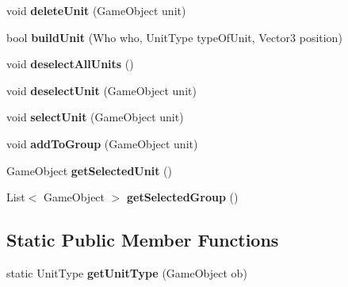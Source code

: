 \begin{DoxyCompactItemize}
\item 
\hypertarget{class_game_controller_a6beec252fc2cf4bbeb8cec79d5174374}{}void {\bfseries delete\+Unit} (Game\+Object unit)\label{class_game_controller_a6beec252fc2cf4bbeb8cec79d5174374}

\item 
\hypertarget{class_game_controller_af2a993666311cdea53c950859c713e35}{}bool {\bfseries build\+Unit} (Who who, Unit\+Type type\+Of\+Unit, Vector3 position)\label{class_game_controller_af2a993666311cdea53c950859c713e35}

\item 
\hypertarget{class_game_controller_a6969a4feb3cbc18212954e0bb7e2e3cd}{}void {\bfseries deselect\+All\+Units} ()\label{class_game_controller_a6969a4feb3cbc18212954e0bb7e2e3cd}

\item 
\hypertarget{class_game_controller_ae3722a2af86bf28e6152de6f9ed802c8}{}void {\bfseries deselect\+Unit} (Game\+Object unit)\label{class_game_controller_ae3722a2af86bf28e6152de6f9ed802c8}

\item 
\hypertarget{class_game_controller_a9a5e2e7359a2d77423644c92678154d2}{}void {\bfseries select\+Unit} (Game\+Object unit)\label{class_game_controller_a9a5e2e7359a2d77423644c92678154d2}

\item 
\hypertarget{class_game_controller_a4fb46a1b2d3b5132ef792f81db466586}{}void {\bfseries add\+To\+Group} (Game\+Object unit)\label{class_game_controller_a4fb46a1b2d3b5132ef792f81db466586}

\item 
\hypertarget{class_game_controller_ab1219cdc405982b5e9947e004fef207b}{}Game\+Object {\bfseries get\+Selected\+Unit} ()\label{class_game_controller_ab1219cdc405982b5e9947e004fef207b}

\item 
\hypertarget{class_game_controller_ab9fb961e72e2bd99bb3da82988143a23}{}List$<$ Game\+Object $>$ {\bfseries get\+Selected\+Group} ()\label{class_game_controller_ab9fb961e72e2bd99bb3da82988143a23}

\end{DoxyCompactItemize}
\subsection*{Static Public Member Functions}
\begin{DoxyCompactItemize}
\item 
\hypertarget{class_game_controller_ae3f5a83f04b65f5a56538bcf4e04f0b6}{}static Unit\+Type {\bfseries get\+Unit\+Type} (Game\+Object ob)\label{class_game_controller_ae3f5a83f04b65f5a56538bcf4e04f0b6}

\end{DoxyCompactItemize}
